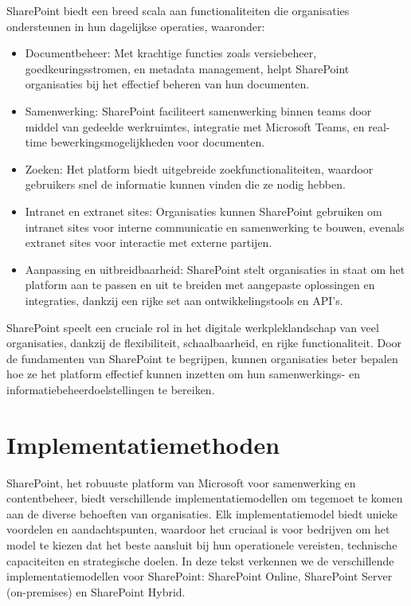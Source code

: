 SharePoint biedt een breed scala aan functionaliteiten die organisaties ondersteunen in hun dagelijkse operaties, waaronder:
\begin{itemize}
\item Documentbeheer: Met krachtige functies zoals versiebeheer, goedkeuringsstromen, en metadata management, helpt SharePoint organisaties bij het effectief beheren van hun documenten.
\item Samenwerking: SharePoint faciliteert samenwerking binnen teams door middel van gedeelde werkruimtes, integratie met Microsoft Teams, en real-time bewerkingsmogelijkheden voor documenten.
\item Zoeken: Het platform biedt uitgebreide zoekfunctionaliteiten, waardoor gebruikers snel de informatie kunnen vinden die ze nodig hebben.
\item Intranet en extranet sites: Organisaties kunnen SharePoint gebruiken om intranet sites voor interne communicatie en samenwerking te bouwen, evenals extranet sites voor interactie met externe partijen.
\item Aanpassing en uitbreidbaarheid: SharePoint stelt organisaties in staat om het platform aan te passen en uit te breiden met aangepaste oplossingen en integraties, dankzij een rijke set aan ontwikkelingstools en API's.
\end{itemize}
SharePoint speelt een cruciale rol in het digitale werkpleklandschap van veel organisaties, dankzij de flexibiliteit, schaalbaarheid, en rijke functionaliteit. Door de fundamenten van SharePoint te begrijpen, kunnen organisaties beter bepalen hoe ze het platform effectief kunnen inzetten om hun samenwerkings- en informatiebeheerdoelstellingen te bereiken.



\section{Implementatiemethoden}%
SharePoint, het robuuste platform van Microsoft voor samenwerking en contentbeheer, biedt verschillende implementatiemodellen om tegemoet te komen aan de diverse behoeften van organisaties. Elk implementatiemodel biedt unieke voordelen en aandachtspunten, waardoor het cruciaal is voor bedrijven om het model te kiezen dat het beste aansluit bij hun operationele vereisten, technische capaciteiten en strategische doelen. In deze tekst verkennen we de verschillende implementatiemodellen voor SharePoint: SharePoint Online, SharePoint Server (on-premises) en SharePoint Hybrid.

